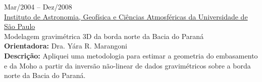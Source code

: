 \faHourglassStart \quad Mar/2004 -- Dez/2008\\
\faInstitution \quad \href{https://www.iag.usp.br/}{Instituto de Astronomia, Geof{\'i}sica e Ci{\^e}ncias Atmosf{\'e}ricas da Universidade de S{\~a}o Paulo}\\
\faExternalLink \quad Modelagem gravim{\'e}trica 3D da borda norte da Bacia do Paran{\'a}\\
\textbf{Orientadora:} Dra. Yára R. Marangoni \\
\textbf{Descrição:} Apliquei uma metodologia para estimar a geometria do 
embasamento e da Moho a partir da inversão não-linear de dados gravimétricos 
sobre a borda norte da Bacia do Paraná.


%
%
%	
%	
%	
%	
%	
%	
%

